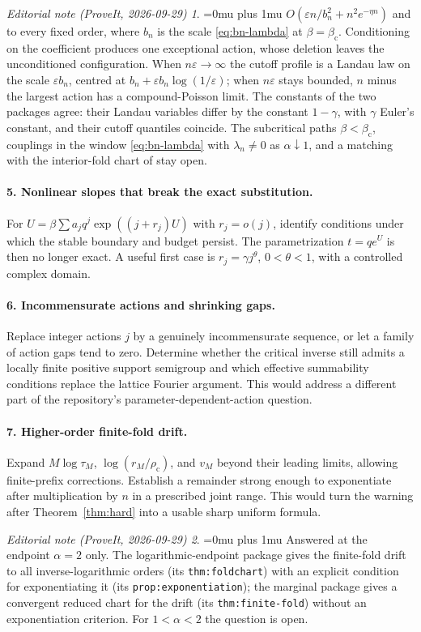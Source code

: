 \documentclass[11pt,a4paper]{article}
\numberwithin{equation}{section}
\theoremstyle{definition}
\theoremstyle{remark}
\newtheorem*{ednoteinner}{Editorial note (ProveIt, 2026-09-29)}
\newenvironment{ednote}{\begin{ednoteinner}\sloppy\Urlmuskip=0mu plus 1mu\relax}{\end{ednoteinner}}
\newcommand{\bc}{\beta_{\mathrm c}}
\newcommand{\rhoc}{\rho_{\mathrm c}}
\begin{document}
\begin{ednote}
$O(\varepsilon n/b_n^2+n^2e^{-\eta n})$ and to every fixed order, where
$b_n$ is the scale \eqref{eq:bn-lambda} at $\beta=\bc$.
Conditioning on the coefficient produces one exceptional action, whose
deletion leaves the unconditioned configuration. When $n\varepsilon\to\infty$
the cutoff profile is a Landau law on the scale $\varepsilon b_n$, centred
at $b_n+\varepsilon b_n\log(1/\varepsilon)$; when $n\varepsilon$ stays
bounded, $n$ minus the largest action has a compound-Poisson limit. The
constants of the two packages agree: their Landau variables differ by the
constant $1-\gamma$, with $\gamma$ Euler's constant, and their cutoff quantiles coincide. The subcritical
paths $\beta<\bc$, couplings in the window \eqref{eq:bn-lambda} with
$\lambda_n\ne0$ as $\alpha\downarrow1$, and a matching with the
interior-fold chart of \cite{ed:lcl} stay open.
\end{ednote}

\paragraph{5. Nonlinear slopes that break the exact substitution.}
For
$U=\beta\sum a_jq^j\exp((j+r_j)U)$ with $r_j=o(j)$, identify conditions
under which the stable boundary and budget persist. The parametrization
$t=qe^U$ is then no longer exact. A useful first case is
$r_j=\gamma j^\theta$, $0<\theta<1$, with a controlled complex domain.

\paragraph{6. Incommensurate actions and shrinking gaps.}
Replace integer actions $j$ by a genuinely incommensurate sequence, or
let a family of action gaps tend to zero. Determine whether the critical
inverse still admits a locally finite positive support semigroup and
which effective summability conditions replace the lattice Fourier
argument. This would address a different part of the repository's
parameter-dependent-action question.

\paragraph{7. Higher-order finite-fold drift.}
Expand $M\log\tau_M$, $\log(r_M/\rhoc)$, and $v_M$ beyond their leading
limits, allowing finite-prefix corrections. Establish a remainder strong
enough to exponentiate after multiplication by $n$ in a prescribed joint
range. This would turn the warning after Theorem~\ref{thm:hard} into a
usable sharp uniform formula.
\begin{ednote}
Answered at the endpoint $\alpha=2$ only. The logarithmic-endpoint package
\cite{ed:lce} gives the finite-fold drift to all inverse-logarithmic orders
(its \texttt{thm:foldchart}) with an explicit condition for exponentiating it
(its \texttt{prop:exponentiation}); the marginal package \cite{ed:mct} gives
a convergent reduced chart for the drift (its \texttt{thm:finite-fold})
without an exponentiation criterion. For $1<\alpha<2$ the question is open.
\end{ednote}
\end{document}
